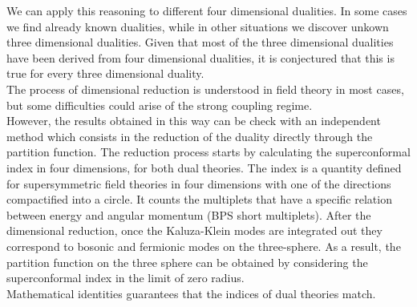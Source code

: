 \begin{comment}

However, it is possible to relate four dimensional dualities to three dimensional ones if we keep the radius of the circle finite. 
If we flow to energies much lower than the inverse of the radius, the behavior of the theory will be effectively three dimensional, since the modes associated to the circle are not excited.\\
The compactification results in an additional term in the superpotential that breaks the symmetries that are allowed in three dimensions but are forbidden in four, such as the axial symmetry.\\
As a result, by keeping the radius finite and flowing to low-energy we obtained a three dimensional duality with some of the symmetries broken by the superpotential term generated by the compactification. 
To restore those symmetries we can integrate out some quarks with large real masses. During this flow the superpotential term generated by the compactification goes to zero and we find a duality between three dimensional theories without additional the superpotential term.\\

\end{comment}

We can apply this reasoning to different four dimensional dualities. 
In some cases we find already known dualities, while in other situations we discover unkown three dimensional dualities. 
Given that most of the three dimensional dualities have been derived from four dimensional dualities, it is conjectured that this is true for every three dimensional duality.\\

The process of dimensional reduction is understood in field theory in most cases, but some difficulties could arise of the strong coupling regime.\\
However, the results obtained in this way can be check with an independent method which consists in the reduction of the duality directly through the partition function.
The reduction process starts by calculating the superconformal index in four dimensions, for both dual theories. 
The index is a quantity defined for supersymmetric field theories in four dimensions with one of the directions compactified into a circle.
It counts the multiplets that have a specific relation between energy and angular momentum (BPS short multiplets). 
After the dimensional reduction, once the Kaluza-Klein modes are integrated out they correspond to bosonic and fermionic 
modes on the three-sphere.  
As a result, the partition function on the three sphere can be obtained by considering the superconformal index in the limit of zero radius.\\
Mathematical identities guarantees that the indices of dual theories match.\\


